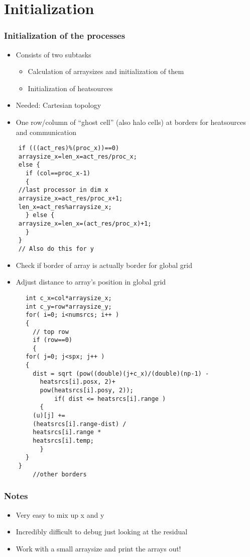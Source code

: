 \section{Initialization}
\begin{frame}
  \frametitle{Initialization of the processes}
  \begin{itemize}
  \item Consists of two subtasks
    \begin{itemize}
    \item Calculation of arraysizes and initialization of them
    \item Initialization of heatsources
    \end{itemize}
    \item Needed: Cartesian topology
    \item One row/column of ``ghost cell'' (also halo cells) at borders for heatsources and communication
  \end{itemize}
\end{frame}


\begin{frame}[fragile]
  \begin{lstlisting}
    if (((act_res)%(proc_x))==0)
    arraysize_x=len_x=act_res/proc_x;
    else {
      if (col==proc_x-1)
      {
	//last processor in dim x
	arraysize_x=act_res/proc_x+1;
	len_x=act_res%arraysize_x;
      } else {
	arraysize_x=len_x=(act_res/proc_x)+1; 
      }
    }    
    // Also do this for y
  \end{lstlisting}


\end{frame}



\begin{frame}
  \begin{itemize}
  \item Check if border of array is actually border for global grid
    \item Adjust distance to array's position in global grid
  \end{itemize}
\end{frame}




\begin{frame}[fragile]
  \begin{lstlisting}
      int c_x=col*arraysize_x;
      int c_y=row*arraysize_y;
      for( i=0; i<numsrcs; i++ )
      {
        // top row 
        if (row==0)
        {
	  for( j=0; j<spx; j++ ) 
	  { 
	    dist = sqrt (pow((double)(j+c_x)/(double)(np-1) -
	      heatsrcs[i].posx, 2)+
	      pow(heatsrcs[i].posy, 2));
              if( dist <= heatsrcs[i].range )
	      {
		(u)[j] += 
		(heatsrcs[i].range-dist) /
		heatsrcs[i].range *
		heatsrcs[i].temp;
	      }
	  }
	}
        //other borders
  \end{lstlisting}
\end{frame}

\begin{frame}
  \frametitle{Notes}
  \begin{itemize}
  \item Very easy to mix up x and y
  \item Incredibly difficult to debug just looking at the residual
  \item Work with a small arraysize and print the arrays out!
  \end{itemize}
\end{frame}
